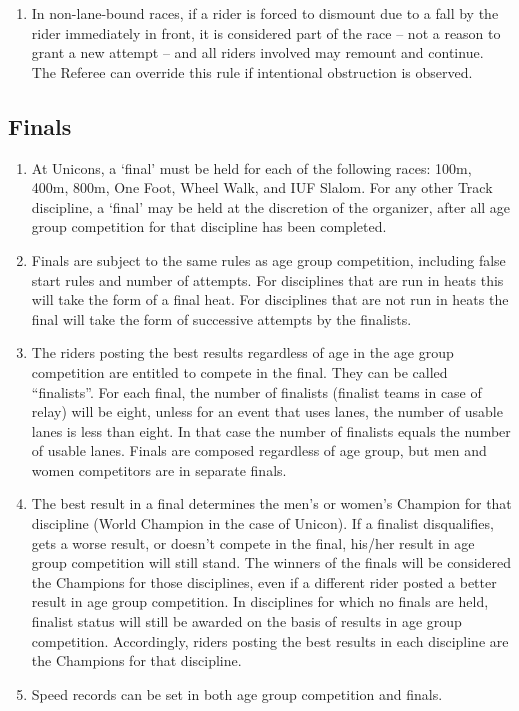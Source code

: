 \begin{enumerate}[leftmargin=1.5em,labelsep=*]
  \item In non-lane-bound races, if a rider is forced to dismount due to a fall by the rider immediately in front, 
  it is considered part of the race -- not a reason to grant a new attempt -- and all riders involved may remount and continue.
  The Referee can override this rule if intentional obstruction is observed.
\end{enumerate}

\subsection{Finals}

\begin{enumerate}[leftmargin=1.5em,labelsep=*]
  \item At Unicons, a `final' must be held for each of the following races: 100m, 400m, 800m, One Foot, Wheel Walk, and IUF Slalom.
  For any other Track discipline, a `final' may be held at the discretion of the organizer, after all age group competition for that discipline has been completed.

  \item Finals are subject to the same rules as age group competition, including false start rules and number of attempts.
    For disciplines that are run in heats this will take the form of a final heat.
    For disciplines that are not run in heats the final will take the form of successive attempts by the finalists.

  \item The riders posting the best results regardless of age in the age group competition are entitled to compete in the final.
    They can be called ``finalists''.
    For each final, the number of finalists (finalist teams in case of relay) will be eight, unless for an event that uses lanes, the number of usable lanes is less than eight.
    In that case the number of finalists equals the number of usable lanes.
    Finals are composed regardless of age group, but men and women competitors are in separate finals.

  \item The best result in a final determines the men's or women's Champion for that discipline (World Champion in the case of Unicon).
    If a finalist disqualifies, gets a worse result, or doesn't compete in the final, 
    his/her result in age group competition will still stand.
    The winners of the finals will be considered the Champions for those disciplines, 
    even if a different rider posted a better result in age group competition.
    In disciplines for which no finals are held, finalist status will still be awarded on the basis of results in age group competition.
    Accordingly, riders posting the best results in each discipline are the Champions for that discipline.
  \item Speed records can be set in both age group competition and finals.

\end{enumerate}

